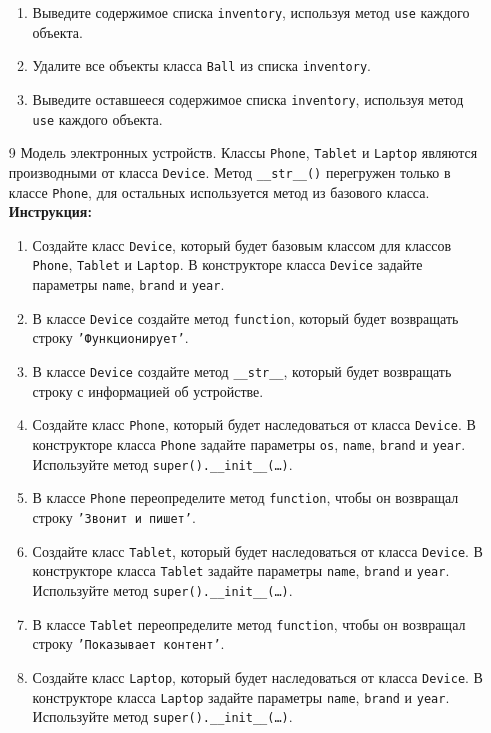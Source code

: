 \begin{enumerate}
\begin{enumerate}
    \item Выведите содержимое списка \texttt{inventory}, используя метод \texttt{use} каждого объекта.
    \item Удалите все объекты класса \texttt{Ball} из списка \texttt{inventory}.
    \item Выведите оставшееся содержимое списка \texttt{inventory}, используя метод \texttt{use} каждого объекта.
\end{enumerate}
\item[9]
Модель электронных устройств. Классы \texttt{Phone}, \texttt{Tablet} и \texttt{Laptop} являются производными от класса \texttt{Device}. Метод \texttt{\_\_str\_\_()} перегружен только в классе \texttt{Phone}, для остальных используется метод из базового класса.
\textbf{Инструкция:}
\begin{enumerate}
    \item Создайте класс \texttt{Device}, который будет базовым классом для классов \texttt{Phone}, \texttt{Tablet} и \texttt{Laptop}. В конструкторе класса \texttt{Device} задайте параметры \texttt{name}, \texttt{brand} и \texttt{year}.
    \item В классе \texttt{Device} создайте метод \texttt{function}, который будет возвращать строку \texttt{'Функционирует'}.
    \item В классе \texttt{Device} создайте метод \texttt{\_\_str\_\_}, который будет возвращать строку с информацией об устройстве.
    \item Создайте класс \texttt{Phone}, который будет наследоваться от класса \texttt{Device}. В конструкторе класса \texttt{Phone} задайте параметры \texttt{os}, \texttt{name}, \texttt{brand} и \texttt{year}. Используйте метод \texttt{super().\_\_init\_\_(\ldots)}.
    \item В классе \texttt{Phone} переопределите метод \texttt{function}, чтобы он возвращал строку \texttt{'Звонит и пишет'}.
    \item Создайте класс \texttt{Tablet}, который будет наследоваться от класса \texttt{Device}. В конструкторе класса \texttt{Tablet} задайте параметры \texttt{name}, \texttt{brand} и \texttt{year}. Используйте метод \texttt{super().\_\_init\_\_(\ldots)}.
    \item В классе \texttt{Tablet} переопределите метод \texttt{function}, чтобы он возвращал строку \texttt{'Показывает контент'}.
    \item Создайте класс \texttt{Laptop}, который будет наследоваться от класса \texttt{Device}. В конструкторе класса \texttt{Laptop} задайте параметры \texttt{name}, \texttt{brand} и \texttt{year}. Используйте метод \texttt{super().\_\_init\_\_(\ldots)}.

\end{enumerate}
\end{enumerate}
